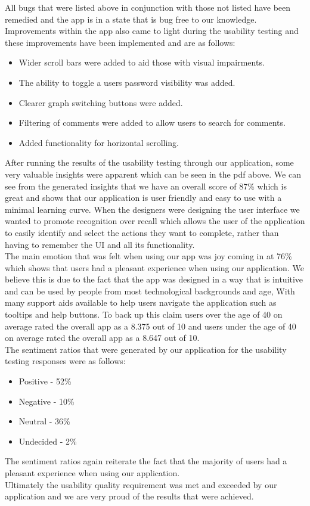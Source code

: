 \documentclass[12pt]{article}
\begin{document}
All bugs that were listed above in conjunction with those not listed have been remedied and the app is in a state that is bug free to our knowledge.
\\
Improvements within the app also came to light during the usability testing and these improvements have been implemented and are as follows:
\begin{itemize}
    \item Wider scroll bars were added to aid those with visual impairments.
    \item The ability to toggle a users password visibility was added.
    \item Clearer graph switching buttons were added.
    \item Filtering of comments were added to allow users to search for comments.
    \item Added functionality for horizontal scrolling.
\end{itemize}
After running the results of the usability testing through our application, some very valuable insights were apparent which can be seen in the pdf above.
We can see from the generated insights that we have an overall score of 87\% which is great and shows that our application is user friendly and easy to use with a minimal learning curve. When the designers were designing the user interface we wanted to promote recognition over recall which allows the user of the application to easily identify and select the actions they want to complete, rather than having to remember the UI and all its functionality.
\\
The main emotion that was felt when using our app was joy coming in at 76\% which shows that users had a pleasant experience when using our application. We believe this is due to the fact that the app was designed in a way that is intuitive and can be used by people from most technological backgrounds and age, With many support aids available to help users navigate the application such as tooltips and help buttons.
To back up this claim users over the age of 40 on average rated the overall app as a 8.375 out of 10 and users under the age of 40 on average rated the overall app as a 8.647 out of 10.
\\
The sentiment ratios that were generated by our application for the usability testing responses were as follows:
\begin{itemize}
    \item Positive - 52\%
    \item Negative - 10\%
    \item Neutral - 36\%
    \item Undecided - 2\%
\end{itemize}
The sentiment ratios again reiterate the fact that the majority of users had a pleasant experience when using our application.
\\
Ultimately the usability quality requirement was met and exceeded by our application and we are very proud of the results that were achieved.
\end{document}
